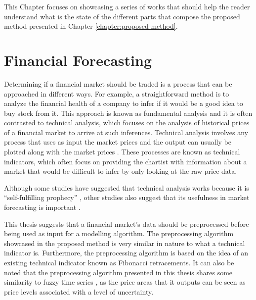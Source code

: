 
This Chapter focuses on showcasing a series of works that should help the reader
understand what is the state of the different parts that compose the proposed
method presented in Chapter \ref{chapter:proposed-method}.

\section{Financial Forecasting}
\label{section:financial-forecasting}

Determining if a financial market should be traded is a process that can be
approached in different ways. For example, a straightforward method is to
analyze the financial health of a company to infer if it would be a good idea to
buy stock from it. This approach is known as fundamental analysis
\cite{Martinez-Jaramillo2009} and it is often contrasted to technical analysis,
which focuses on the analysis of historical prices of a financial market to
arrive at such inferences. Technical analysis involves any process that uses as
input the market prices and the output can usually be plotted along with the
market prices \cite{Achelis2000}. These processes are known as technical
indicators, which often focus on providing the chartist with information about a
market that would be difficult to infer by only looking at the raw price data.

Although some studies have suggested that technical analysis works because it is
``self-fulfilling prophecy'' \cite{Salganik2008} \cite{Fund1992}, other studies
also suggest that its usefulness in market forecasting is important
\cite{Kadiri2015} \cite{Fund1992}.

This thesis suggests that a financial market's data should be preprocessed
before being used as input for a modelling algorithm. The preprocessing
algorithm showcased in the proposed method is very similar in nature to what a
technical indicator is. Furthermore, the preprocessing algorithm is based on the
idea of an existing technical indicator known as Fibonacci retracements. It can
also be noted that the preprocessing algorithm presented in this thesis shares
some similarity to fuzzy time series \cite{Cai2013}, as the price areas that it
outputs can be seen as price levels associated with a level of uncertainty.

